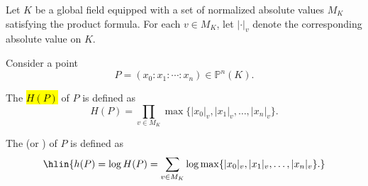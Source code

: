 \begin{definition} \label{definition:height_of_points_on_projective_space_over_a_global_field}
    Let $K$ be a global field equipped with a set of normalized absolute values $M_K$ satisfying the product formula. For each $v \in M_K$, let $|\cdot|_v$ denote the corresponding absolute value on $K$.

    Consider a point 
    $$P = (x_0 : x_1 : \cdots : x_n) \in \mathbb{P}^n(K).$$

    The  \hl{$H(P)$} of $P$ is defined as
    $$H(P) = \prod_{v \in M_K} \max \{ |x_0|_v, |x_1|_v, \ldots, |x_n|_v \}.$$

    The  (or ) of $P$ is defined as
    $$\hlin{h(P) = \log H(P) = \sum_{v \in M_K} \log \max \{ |x_0|_v, |x_1|_v, \ldots, |x_n|_v \}.}$$
\end{definition}